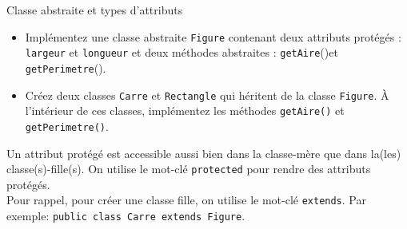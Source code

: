 	
	\begin{Exercice}[15 minutes]{Classe abstraite et types d'attributs}
	\begin{itemize}
		\item Implémentez une classe abstraite \lstinline{Figure} contenant deux attributs protégés : \lstinline{largeur} et \lstinline{longueur} et deux méthodes abstraites : \lstinline{getAire}()et \lstinline{getPerimetre}().
		\item Créez deux classes \lstinline{Carre} et \lstinline{Rectangle} qui héritent de la classe \lstinline{Figure}. À l'intérieur de ces classes, implémentez les méthodes \lstinline{getAire()} et \lstinline{getPerimetre()}.
	\end{itemize}
	
	\begin{conseil}
		Un attribut protégé est accessible aussi bien dans la classe-mère que dans la(les) classe(s)-fille(s). On utilise le mot-clé \lstinline{protected} pour rendre des attributs protégés. \\
		Pour rappel, pour créer une classe fille, on utilise le mot-clé \lstinline{extends}. Par exemple: \lstinline{public class Carre extends Figure}.
	\end{conseil}
	
	
	\begin{solution}
	 
	\end{solution}
	\end{Exercice}
	\newpage
